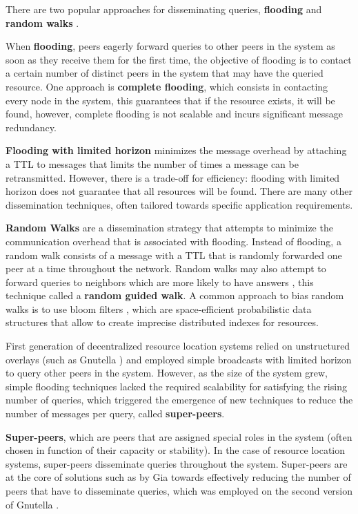 There are two popular approaches for disseminating queries, \textbf{flooding} and \textbf{random walks} \cite{leitaoPHDthesis}.

When \textbf{flooding}, peers eagerly forward queries to other peers in the system as soon as they receive them for the first time, the objective of flooding is to contact a certain number of distinct peers in the system that may have the queried resource. One approach is \textbf{complete flooding}, which consists in contacting every node in the system, this guarantees that if the resource exists, it will be found, however, complete flooding is not scalable and incurs significant message redundancy. 

\textbf{Flooding with limited horizon} minimizes the message overhead by attaching a TTL to messages that limits the number of times a message can be retransmitted. However, there is a trade-off for efficiency: flooding with limited horizon does not guarantee that all resources will be found. There are many other dissemination techniques, often tailored towards specific application requirements. 

\textbf{Random Walks} are a dissemination strategy that attempts to minimize the communication overhead that is associated with flooding. Instead of flooding, a random walk consists of a message with a TTL that is randomly forwarded one peer at a time throughout the network. Random walks may also attempt to forward queries to neighbors which are more likely to have answers \cite{1022239}, this technique called a \textbf{random guided walk}. A common approach to bias random walks is to use bloom filters \cite{5751342}, which are space-efficient probabilistic data structures that allow to  create imprecise distributed indexes for resources.

First generation of decentralized resource location systems relied on unstructured overlays (such as Gnutella \cite{gnutella_gtk}) and employed simple broadcasts with limited horizon to query other peers in the system. However, as the size of the system grew, simple flooding techniques lacked the required scalability for satisfying the rising number of queries, which triggered the emergence of new techniques to reduce the number of messages per query, called \textbf{super-peers}. 

\textbf{Super-peers}, which are peers that are assigned special roles in the system (often chosen in function of their capacity or stability). In the case of resource location systems, super-peers disseminate queries throughout the system. Super-peers are at the core of solutions such as by Gia \cite{Chawathe2003} towards effectively reducing the number of peers that have to disseminate queries, which was employed on the second version of Gnutella \cite{gnutella_gtk}. 

